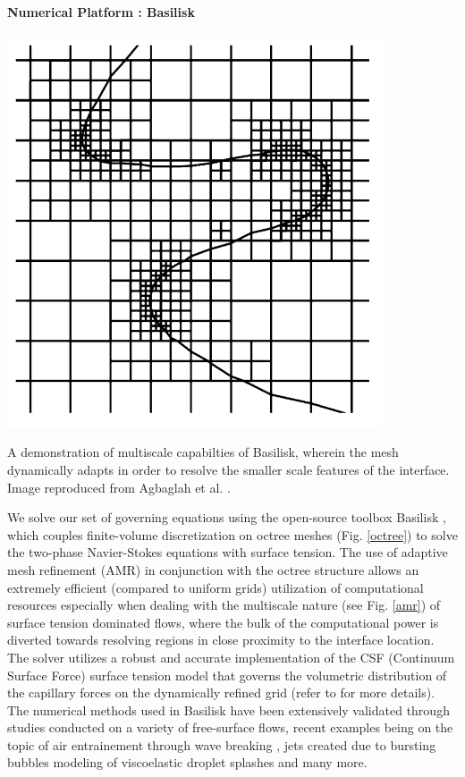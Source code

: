 \paragraph{Numerical Platform : Basilisk}

\begin{marginfigure}
\centering
\includegraphics{plots/ligament_breakup/multi_scale.png}
\caption{ A demonstration of multiscale capabilties
of Basilisk, wherein the mesh dynamically adapts in order
to resolve the smaller scale features of the interface. 
Image reproduced from Agbaglah et al. \cite{agbag}.
}
\label{amr}
\end{marginfigure}


We solve our set of governing equations using the open-source toolbox 
Basilisk \cite{basilisk}, which couples finite-volume discretization 
on octree meshes (Fig. \ref{octree}) to solve the two-phase 
Navier-Stokes equations with surface tension.
The use of adaptive mesh refinement (AMR) in conjunction with the octree structure
allows an extremely efficient (compared to uniform grids) utilization of 
computational resources especially when dealing with the multiscale nature (see Fig. \ref{amr}) 
of surface tension dominated flows, where the bulk of the computational power
is diverted towards resolving regions in close proximity to the interface location. 
The solver utilizes a robust and accurate implementation 
of the CSF \cite{csf} (Continuum Surface Force) surface tension model 
that governs the volumetric distribution of the capillary forces on the dynamically 
refined grid (refer to \cite{popinet2009accurate} for more details). 
The numerical methods used in Basilisk have been extensively validated
through studies conducted on a variety of free-surface flows, 
recent examples being on the topic of air entrainement through wave breaking
\cite{basilisk_1, basilisk_3}, jets created due to bursting bubbles \cite{basilisk_2, basilisk_5}
modeling of viscoelastic droplet splashes \cite{basilisk_4} and many more.


